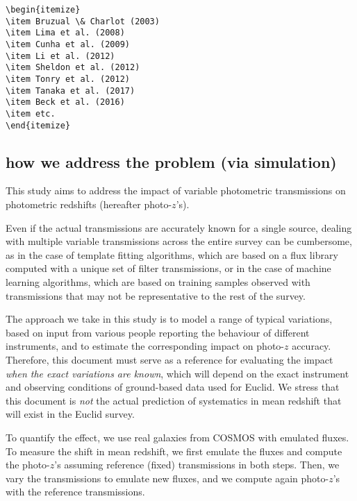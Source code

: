 \documentclass[11pt]{article}
\begin{document}
\begin{verbatim}
\begin{itemize}
\item Bruzual \& Charlot (2003)
\item Lima et al. (2008)
\item Cunha et al. (2009)
\item Li et al. (2012)
\item Sheldon et al. (2012)
\item Tonry et al. (2012)
\item Tanaka et al. (2017)
\item Beck et al. (2016)
\item etc.
\end{itemize}
\end{verbatim}

\subsection{how we address the problem (via
simulation)}\label{how-we-address-the-problem-via-simulation}

This study aims to address the impact of variable photometric
transmissions on photometric redshifts (hereafter photo-\(z\)'s).

Even if the actual transmissions are accurately known for a single
source, dealing with multiple variable transmissions across the entire
survey can be cumbersome, as in the case of template fitting algorithms,
which are based on a flux library computed with a unique set of filter
transmissions, or in the case of machine learning algorithms, which are
based on training samples observed with transmissions that may not be
representative to the rest of the survey.

The approach we take in this study is to model a range of typical
variations, based on input from various people reporting the behaviour
of different instruments, and to estimate the corresponding impact on
photo-\(z\) accuracy. Therefore, this document must serve as a reference
for evaluating the impact \emph{when the exact variations are known},
which will depend on the exact instrument and observing conditions of
ground-based data used for Euclid. We stress that this document is
\emph{not} the actual prediction of systematics in mean redshift that
will exist in the Euclid survey.

To quantify the effect, we use real galaxies from COSMOS with emulated
fluxes. To measure the shift in mean redshift, we first emulate the
fluxes and compute the photo-\(z\)'s assuming reference (fixed)
transmissions in both steps. Then, we vary the transmissions to emulate
new fluxes, and we compute again photo-\(z\)'s with the reference
transmissions.
\end{document}
